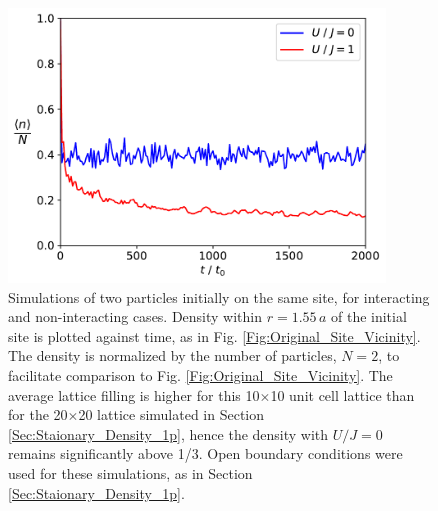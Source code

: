 \begin{figure}[ht]
    \centering
    \includegraphics[width=10cm]{Figures/Stationary_Density_2p}
    \caption{Simulations of two particles initially on the same site, for interacting and non-interacting cases. Density within $r=1.55\,a$ of the initial site is plotted against time, as in Fig. \ref{Fig:Original_Site_Vicinity}. The density is normalized by the number of particles, $N=2$, to facilitate comparison to Fig. \ref{Fig:Original_Site_Vicinity}. The average lattice filling is higher for this 10$\times$10 unit cell lattice than for the 20$\times$20 lattice simulated in Section \ref{Sec:Staionary_Density_1p}, hence the density with $U/J=0$ remains significantly above 1/3. Open boundary conditions were used for these simulations, as in Section \ref{Sec:Staionary_Density_1p}.}
    \label{Fig:Stationary_Density_2p}
\end{figure}